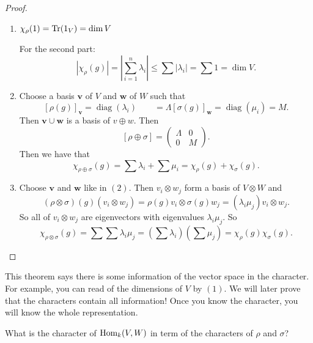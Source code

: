 \begin{proof}
    \begin{enumerate}[(1)]
        \item $\chi_\rho(1) = \operatorname{Tr}(1_V) = \dim V$

            For the second part:
            \[
                |\chi_\rho(g)| = \left| \sum_{i=1}^{n} \lambda_i\right| \le  \sum |\lambda_i| = \sum 1 = \dim V
            .\] 
            
        \item Choose a basis $\mathbf{v}$ of $V$ and  $\mathbf{w}$ of $W$ such that 
            \[
                [\rho(g)]_{\mathbf{v}} = \operatorname{diag}(\lambda_i) \qquad  = \Lambda
                [\sigma(g)]_{\mathbf{w}} = \operatorname{diag}(\mu_i) = M
            .\] 
            Then $\mathbf{v} \cup  \mathbf{w}$ is a basis of $v\oplus w$.
            Then
            \[
                [\rho \oplus \sigma] = \begin{pmatrix}
                    \Lambda & 0 \\
                    0 & M
                \end{pmatrix}
            .\] 
            Then we have that 
            \[
                \chi_{\rho \oplus \sigma}(g) = \sum \lambda_i + \sum \mu_i = \chi_\rho(g) + \chi_\sigma(g)
            .\] 
        \item Choose $\mathbf{v}$ and $\mathbf{w}$ like in $(2)$.
            Then
             $v_i \otimes w_j$ form a basis of $V \otimes W$ and 
             \[
                 (\rho \otimes \sigma)(g)( v_i \otimes w_j ) = \rho(g)v_i \otimes \sigma(g) w_j = (\lambda_i \mu_j) v_i \otimes w_j.
         \]
         So all of $v_i \otimes w_j$ are eigenvectors with eigenvalues $\lambda_i \mu_j$.
         So
          \[
              \chi_{\rho \otimes \sigma}(g) = \sum \sum \lambda_i \mu_j = (\sum \lambda_i) (\sum \mu_j) = \chi_\rho(g) \chi_\sigma(g)
         .\] 
    \end{enumerate}
\end{proof}

This theorem says there is some information of the vector space in the character. For example, you can read of the dimensions of $V$ by $(1)$.
We will later prove that the characters contain all information!
Once you know the character, you will know the whole representation.

\begin{ex}
    What is the character of $\operatorname{Hom}_{k}(V, W)$ in term of the characters of $\rho$ and $\sigma$?
\end{ex}

